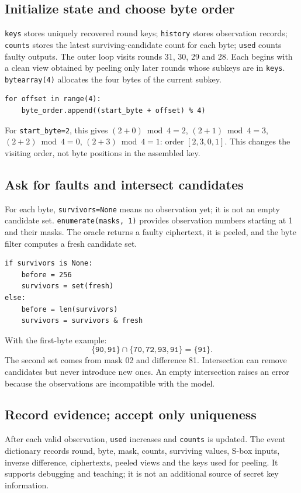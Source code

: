 \documentclass[11pt,a4paper]{article}
\newcommand{\hx}[1]{\texttt{#1}}
\newcommand{\hex}[1]{\texttt{#1}}
\begin{document}
\subsection{Initialize state and choose byte order}
\hx{keys} stores uniquely recovered round keys; \hx{history} stores observation
records; \hx{counts} stores the latest surviving-candidate count for each byte;
\hx{used} counts faulty outputs.
The outer loop visits rounds 31, 30, 29 and 28. Each begins with a clean view
obtained by peeling only later rounds whose subkeys are in \hx{keys}.
\hx{bytearray(4)} allocates the four bytes of the current subkey.
\begin{Verbatim}
for offset in range(4):
    byte_order.append((start_byte + offset) % 4)
\end{Verbatim}
For \hx{start\_byte=2}, this gives
$(2+0)\bmod4=2$, $(2+1)\bmod4=3$, $(2+2)\bmod4=0$,
$(2+3)\bmod4=1$: order $[2,3,0,1]$.
This changes the visiting order, not byte positions in the assembled key.

\subsection{Ask for faults and intersect candidates}
For each byte, \hx{survivors=None} means no observation yet; it is not an empty
candidate set. \hx{enumerate(masks, 1)} provides observation numbers starting at 1
and their masks. The oracle returns a faulty ciphertext, it is peeled, and
the byte filter computes a fresh candidate set.
\begin{Verbatim}
if survivors is None:
    before = 256
    survivors = set(fresh)
else:
    before = len(survivors)
    survivors = survivors & fresh
\end{Verbatim}
With the first-byte example:
\[
\{\hex{90},\hex{91}\}\cap
\{\hex{70},\hex{72},\hex{93},\hex{91}\}=\{\hex{91}\}.
\]
The second set comes from mask 02 and difference 81. Intersection can remove
candidates but never introduce new ones. An empty intersection raises an error
because the observations are incompatible with the model.

\subsection{Record evidence; accept only uniqueness}
After each valid observation, \hx{used} increases and \hx{counts} is updated.
The event dictionary records round, byte, mask, counts, surviving values,
S-box inputs, inverse difference, ciphertexts, peeled views and the keys used
for peeling. It supports debugging and teaching; it is not an additional source
of secret key information.
\end{document}
